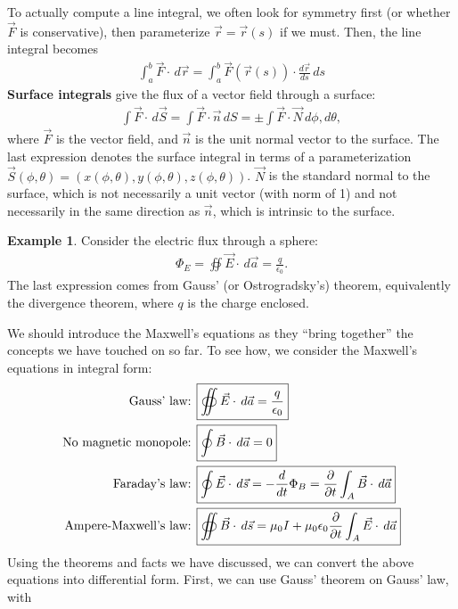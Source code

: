 \documentclass{book}
\theoremstyle{definition}
\newtheorem{exmp}{Example}[section]
\begin{document}
To actually compute a line integral, we often look for symmetry first (or whether $\vec{F}$ is conservative), then parameterize $\vec{r} = \vec{r}(s)$ if we must. Then, the line integral becomes
\begin{align*}
\int_{a}^{b}\vec{F}\cdot\,d\vec{r} = \int_{a}^{b}\vec{F}(\vec{r}(s))\cdot \frac{d\vec{r}}{ds}\,ds
\end{align*}
\textbf{Surface integrals} give the flux of a vector field through a surface:
\begin{align*}
\int \vec{F}\cdot\,d\vec{S} = \int\vec{F}\cdot\vec{n}\,dS = \pm\int\vec{F}\cdot\vec{N}\,d\phi,d\theta,
\end{align*}
where $\vec{F}$ is the vector field, and $\vec{n}$ is the unit normal vector to the surface. The last expression denotes the surface integral in terms of a parameterization $\vec{S}(\phi, \theta) = (x(\phi, \theta),y(\phi, \theta),z(\phi, \theta))$. $\vec{N}$ is the standard normal to the surface, which is not necessarily a unit vector (with norm of 1) and not necessarily in the same direction as $\vec{n}$, which is intrinsic to the surface.
\begin{exmp}
Consider the electric flux through a sphere:
\begin{align*}
\Phi_E = \oiint\vec{E}\cdot\,d\vec{a} = \frac{q}{\epsilon_0}.
\end{align*}
The last expression comes from Gauss' (or Ostrogradsky's) theorem, equivalently the divergence theorem, where $q$ is the charge enclosed.
\end{exmp}
We should introduce the Maxwell's equations as they ``bring together'' the concepts we have touched on so far. To see how, we consider the Maxwell's equations in integral form:
\begin{align*}
\text{Gauss' law:  } \Aboxed{&\oiint\vec{E}\cdot\,d\vec{a} = \frac{q}{\epsilon_0}}\\
\text{No magnetic monopole:  } \Aboxed{&\oint\vec{B}\cdot\,d\vec{a} = 0}\\
\text{Faraday's law:  } 
\Aboxed{&\oint \vec{E}\cdot\,d\vec{s} = -\frac{d}{dt}\Phi_B = \frac{\partial}{\partial t}\int_A\vec{B}\cdot\,d\vec{a}}\\  
\text{Ampere-Maxwell's law:  } 
\Aboxed{&\oiint \vec{B}\cdot\,d\vec{s} = \mu_0I + \mu_0\epsilon_0\frac{\partial}{\partial t}\int_A\vec{E}\cdot\,d\vec{a}}
\end{align*}
Using the theorems and facts we have discussed, we can convert the above equations into differential form. First, we can use Gauss' theorem on Gauss' law, with
\end{document}
